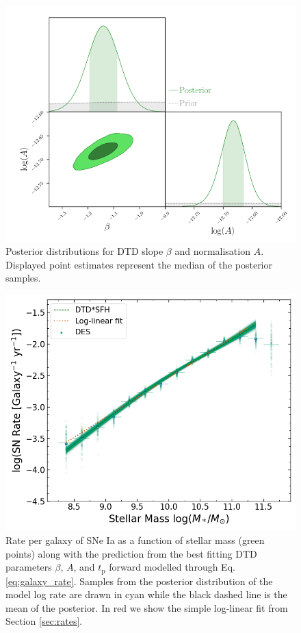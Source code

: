 \documentclass[fleqn,usenatbib]{mnras}
\begin{document}
\begin{figure}
    \centering
    \includegraphics[width=.5\textwidth]{figs/fit_dtd_all_A_beta_corner.png}
    \caption{Posterior distributions for DTD slope $\beta$ and normalisation $A$. Displayed point estimates represent the median of the posterior samples.%
    \label{fig:corner_beta_norm}}
\end{figure}
\begin{figure}
    \centering
    \includegraphics[width=.5\textwidth]{figs/rate_vs_mass_DTD_fit_beta_norm_Qerf1.1.png}
    \caption{Rate per galaxy of SNe Ia as a function of stellar mass (green points) along with the prediction from the best fitting DTD parameters $\beta$, $A$, and $t_{\mathrm{p}}$ forward modelled through Eq. \ref{eq:galaxy_rate}. Samples from the posterior distribution of the model log rate are drawn in cyan while the black dashed line is the mean of the posterior. In red we show the simple log-linear fit from Section \ref{sec:rates}.%
    \label{fig:rate_fitted}}
\end{figure}
\end{document}
